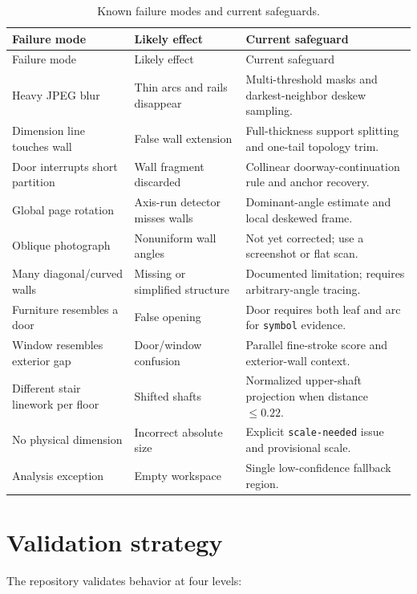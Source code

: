 \documentclass[11pt,a4paper]{article}
\newcommand{\code}[1]{\texttt{#1}}
\begin{document}
\small
\begin{longtable}{@{}p{34mm}p{54mm}p{64mm}@{}}
\caption{Known failure modes and current safeguards.}\label{tab:failures}\\
\toprule
Failure mode & Likely effect & Current safeguard \\
\midrule
\endfirsthead
\toprule
Failure mode & Likely effect & Current safeguard \\
\midrule
\endhead
Heavy JPEG blur & Thin arcs and rails disappear & Multi-threshold masks and darkest-neighbor deskew sampling. \\
Dimension line touches wall & False wall extension & Full-thickness support splitting and one-tail topology trim. \\
Door interrupts short partition & Wall fragment discarded & Collinear doorway-continuation rule and anchor recovery. \\
Global page rotation & Axis-run detector misses walls & Dominant-angle estimate and local deskewed frame. \\
Oblique photograph & Nonuniform wall angles & Not yet corrected; use a screenshot or flat scan. \\
Many diagonal/curved walls & Missing or simplified structure & Documented limitation; requires arbitrary-angle tracing. \\
Furniture resembles a door & False opening & Door requires both leaf and arc for \code{symbol} evidence. \\
Window resembles exterior gap & Door/window confusion & Parallel fine-stroke score and exterior-wall context. \\
Different stair linework per floor & Shifted shafts & Normalized upper-shaft projection when distance $\leq0.22$. \\
No physical dimension & Incorrect absolute size & Explicit \code{scale-needed} issue and provisional scale. \\
Analysis exception & Empty workspace & Single low-confidence fallback region. \\
\bottomrule
\end{longtable}

\section{Validation strategy}

The repository validates behavior at four levels:
\end{document}

